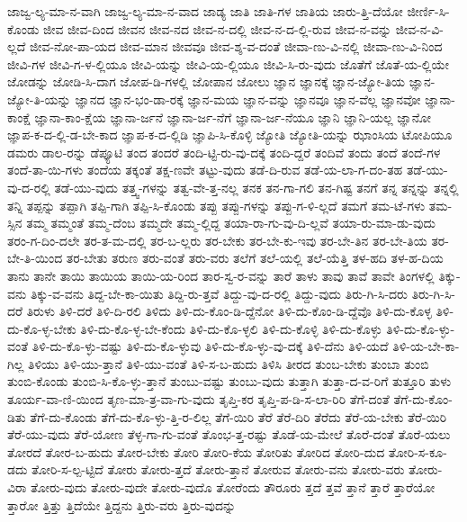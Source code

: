 {ಜಾಜ್ವ-ಲ್ಯ-ಮಾ-ನ-ವಾಗಿ
ಜಾಜ್ವ-ಲ್ಯ-ಮಾ-ನ-ವಾದ
ಜಾಡ್ಯ
ಜಾತಿ
ಜಾತಿ-ಗಳ
ಜಾತಿಯ
ಜಾರು-ತ್ತಿ-ದೆಯೋ
ಜೀರ್ಣಿ-ಸಿ-ಕೊಂಡು
ಜೀವ
ಜೀವ-ದಿಂದ
ಜೀವನ
ಜೀವ-ನದ
ಜೀವ-ನ-ದಲ್ಲಿ
ಜೀವ-ನ-ದ-ಲ್ಲಿ-ರುವ
ಜೀವ-ನ-ವನ್ನು
ಜೀವ-ನ-ವಿ-ಲ್ಲದೆ
ಜೀವ-ನೋ-ಪಾ-ಯದ
ಜೀವ-ಮಾನ
ಜೀವವೂ
ಜೀವ-ಶ್ಶ-ವ-ದಂತೆ
ಜೀವಾ-ಣು-ವಿ-ನಲ್ಲಿ
ಜೀವಾ-ಣು-ವಿ-ನಿಂದ
ಜೀವಿ-ಗಳ
ಜೀವಿ-ಗ-ಳ-ಲ್ಲಿಯೂ
ಜೀವಿ-ಯನ್ನು
ಜೀವಿ-ಯ-ಲ್ಲಿಯೂ
ಜೀವಿ-ಸಿ-ರು-ವುದು
ಜೊತೆಗೆ
ಜೊತೆ-ಯ-ಲ್ಲಿಯೇ
ಜೋಡನ್ನು
ಜೋಡಿ-ಸಿ-ದಾಗ
ಜೋಪ-ಡಿ-ಗಳಲ್ಲಿ
ಜೋಪಾನ
ಜೋಲು
ಜ್ಞಾನ
ಜ್ಞಾನಕ್ಕೆ
ಜ್ಞಾನ-ಜ್ಯೋ-ತಿಯ
ಜ್ಞಾನ-ಜ್ಯೋ-ತಿ-ಯನ್ನು
ಜ್ಞಾನದ
ಜ್ಞಾನ-ಭಂ-ಡಾ-ರಕ್ಕೆ
ಜ್ಞಾನ-ಮಯ
ಜ್ಞಾನ-ವನ್ನು
ಜ್ಞಾನವೂ
ಜ್ಞಾನ-ವೆಲ್ಲ
ಜ್ಞಾನವೋ
ಜ್ಞಾನಾ-ಕಾಂಕ್ಷೆ
ಜ್ಞಾನಾ-ಕಾಂ-ಕ್ಷೆಯ
ಜ್ಞಾನಾ-ರ್ಜನೆ
ಜ್ಞಾನಾ-ರ್ಜ-ನೆಗೆ
ಜ್ಞಾನಾ-ರ್ಜ-ನೆಯೂ
ಜ್ಞಾನಿ
ಜ್ಞಾನಿ-ಯಲ್ಲ
ಜ್ಞಾನೋ
ಜ್ಞಾಪ-ಕ-ದ-ಲ್ಲಿ-ಡ-ಬೇ-ಕಾದ
ಜ್ಞಾಪ-ಕ-ದ-ಲ್ಲಿಡಿ
ಜ್ಞಾಪಿ-ಸಿ-ಕೊಳ್ಳಿ
ಜ್ಯೋತಿ
ಜ್ಯೋತಿ-ಯನ್ನು
ಝಾಂಸಿಯ
ಟೋಪಿಯೂ
ಡಮರು
ಡಾಲ-ರನ್ನು
ಡೆಪ್ಯೂಟಿ
ತಂದ
ತಂದರೆ
ತಂದಿ-ಟ್ಟಿ-ರು-ವು-ದಕ್ಕೆ
ತಂದಿ-ದ್ದರೆ
ತಂದಿವೆ
ತಂದು
ತಂದೆ
ತಂದೆ-ಗಳ
ತಂದೆ-ತಾ-ಯಿ-ಗಳು
ತಂದೆಯ
ತಕ್ಕಂತೆ
ತಕ್ಷ-ಣವೇ
ತಟ್ಟು-ವುದು
ತಡೆ-ದಿ-ರುವ
ತಡೆ-ಯ-ಲಾ-ಗ-ದಂ-ತಹ
ತಡೆ-ಯು-ವು-ದ-ರಲ್ಲಿ
ತಡೆ-ಯು-ವುದು
ತತ್ತ್ವ-ಗಳನ್ನು
ತತ್ವ-ವೇ-ತ್ತ-ನಲ್ಲ
ತನಕ
ತನ-ಗಾ-ಗಲಿ
ತನ-ಗಿಷ್ಟ
ತನಗೆ
ತನ್ನ
ತನ್ನನ್ನು
ತನ್ನಲ್ಲಿ
ತನ್ನಿ
ತಪ್ಪನ್ನು
ತಪ್ಪಾಗಿ
ತಪ್ಪಿ-ಗಾಗಿ
ತಪ್ಪಿ-ಸಿ-ಕೊಂಡು
ತಪ್ಪು
ತಪ್ಪು-ಗಳನ್ನು
ತಪ್ಪು-ಗ-ಳಿ-ಲ್ಲದೆ
ತಮಗೆ
ತಮ-ಟೆ-ಗಳು
ತಮ-ಸ್ಸಿನ
ತಮ್ಮ
ತಮ್ಮಂತೆ
ತಮ್ಮ-ದೆಂಬ
ತಮ್ಮದೇ
ತಮ್ಮ-ಲ್ಲಿದ್ದ
ತಯಾ-ರಾ-ಗು-ವು-ದಿ-ಲ್ಲವೆ
ತಯಾ-ರು-ಮಾ-ಡು-ವುದು
ತರಂ-ಗ-ದಿಂ-ದಲೇ
ತರ-ತ-ಮ-ದಲ್ಲಿ
ತರ-ಬ-ಲ್ಲರು
ತರ-ಬೇಕು
ತರ-ಬೇ-ಕು-ಇವು
ತರ-ಬೇ-ತಿನ
ತರ-ಬೇ-ತಿಯ
ತರ-ಬೇ-ತಿ-ಯಿಂದ
ತರ-ಬೇತು
ತರುಣ
ತರು-ವಂತೆ
ತರು-ವರು
ತಲೆಗೆ
ತಲೆ-ಯಲ್ಲಿ
ತಲೆ-ಯೆತ್ತಿ
ತಳ-ಹದಿ
ತಳ-ಹ-ದಿಯ
ತಾನು
ತಾನೇ
ತಾಯಿ
ತಾಯಿಯ
ತಾಯಿ-ಯ-ರಿಂದ
ತಾರ-ಸ್ವ-ರ-ವನ್ನು
ತಾರೆ
ತಾಳು
ತಾವು
ತಾವೆ
ತಾವೇ
ತಿಂಗಳಲ್ಲಿ
ತಿಕ್ಕು-ವನು
ತಿಕ್ಕು-ವ-ವನು
ತಿದ್ದ-ಬೇ-ಕಾ-ಯಿತು
ತಿದ್ದಿ-ರು-ತ್ತವೆ
ತಿದ್ದು-ವು-ದ-ರಲ್ಲಿ
ತಿದ್ದು-ವುದು
ತಿರು-ಗಿ-ಸಿ-ದರು
ತಿರು-ಗಿ-ಸಿ-ದರೆ
ತಿರುಳು
ತಿಳಿ-ದರೆ
ತಿಳಿ-ದಿ-ರಲಿ
ತಿಳಿದು
ತಿಳಿ-ದು-ಕೊಂ-ಡಿ-ದ್ದೆನೋ
ತಿಳಿ-ದು-ಕೊಂ-ಡಿ-ದ್ದೆವೊ
ತಿಳಿ-ದು-ಕೊಳ್ಳ
ತಿಳಿ-ದು-ಕೊ-ಳ್ಳ-ಬೇಕು
ತಿಳಿ-ದು-ಕೊ-ಳ್ಳ-ಬೇ-ಕೆಂದು
ತಿಳಿ-ದು-ಕೊ-ಳ್ಳಲಿ
ತಿಳಿ-ದು-ಕೊಳ್ಳಿ
ತಿಳಿ-ದು-ಕೊಳ್ಳು
ತಿಳಿ-ದು-ಕೊ-ಳ್ಳು-ವಂತೆ
ತಿಳಿ-ದು-ಕೊ-ಳ್ಳು-ವಷ್ಟು
ತಿಳಿ-ದು-ಕೊ-ಳ್ಳುವು
ತಿಳಿ-ದು-ಕೊ-ಳ್ಳು-ವು-ದಕ್ಕೆ
ತಿಳಿ-ದೆನು
ತಿಳಿ-ಯದೆ
ತಿಳಿ-ಯ-ಬೇ-ಕಾ-ಗಿಲ್ಲ
ತಿಳಿಯು
ತಿಳಿ-ಯು-ತ್ತಾನೆ
ತಿಳಿ-ಯು-ವಂತೆ
ತಿಳಿ-ಸ-ಬ-ಹುದು
ತಿಳಿಸಿ
ತೀರದ
ತುಂಬ-ಬೇಕು
ತುಂಬಾ
ತುಂಬಿ
ತುಂಬಿ-ಕೊಂಡು
ತುಂಬಿ-ಸಿ-ಕೊ-ಳ್ಳು-ತ್ತಾನೆ
ತುಂಬು-ವಷ್ಟು
ತುಂಬು-ವುದು
ತುತ್ತಾಗಿ
ತುತ್ತಾ-ದ-ವ-ರಿಗೆ
ತುತ್ತೂರಿ
ತುಳು
ತೂರ್ಯ-ವಾ-ಣಿ-ಯಿಂದ
ತೃಣ-ಮಾ-ತ್ರ-ವಾ-ಗು-ವುದು
ತೃಪ್ತಿ-ಕರ
ತೃಪ್ತಿ-ಪ-ಡಿ-ಸ-ಲಾ-ರಿರಿ
ತೆಗೆ-ದಂತೆ
ತೆಗೆ-ದು-ಕೊಂ-ಡಿತು
ತೆಗೆ-ದು-ಕೊಂಡು
ತೆಗೆ-ದು-ಕೊ-ಳ್ಳು-ತ್ತಿ-ರ-ಲಿಲ್ಲ
ತೆಗೆ-ಯಿರಿ
ತೆರೆ
ತೆರೆ-ದಿರಿ
ತೆರೆದು
ತೆರೆ-ಯ-ಬೇಕು
ತೆರೆ-ಯಿರಿ
ತೆರೆ-ಯು-ವುದು
ತೆರೆ-ಯೋಣ
ತೆಳ್ಳ-ಗಾ-ಗು-ವಂತೆ
ತೊಂಭ-ತ್ತ-ರಷ್ಟು
ತೊಡೆ-ಯ-ಮೇಲೆ
ತೊರೆ-ದಂತೆ
ತೊರೆ-ಯಲು
ತೋರದೆ
ತೋರ-ಬ-ಹುದು
ತೋರ-ಬೇಕು
ತೋರಿ
ತೋರಿ-ಕೆಯ
ತೋರಿತು
ತೋರಿದ
ತೋರಿ-ದುದ
ತೋರಿ-ಸ-ಕೂ-ಡದು
ತೋರಿ-ಸ-ಲ್ಪ-ಟ್ಟಿದೆ
ತೋರು
ತೋರು-ತ್ತದೆ
ತೋರು-ತ್ತಾನೆ
ತೋರುವ
ತೋರು-ವನು
ತೋರು-ವರು
ತೋರು-ವಿರಾ
ತೋರು-ವುದು
ತೋರು-ವುದೇ
ತೋರು-ವುದೊ
ತೋರೆಂದು
ತೌರೂರು
ತ್ತದೆ
ತ್ತವೆ
ತ್ತಾನೆ
ತ್ತಾರೆ
ತ್ತಾರೆಯೋ
ತ್ತಾರೋ
ತ್ತಿತ್ತು
ತ್ತಿದೆಯೇ
ತ್ತಿದ್ದನು
ತ್ತಿರು-ವರು
ತ್ತಿರು-ವುದನ್ನು
}
